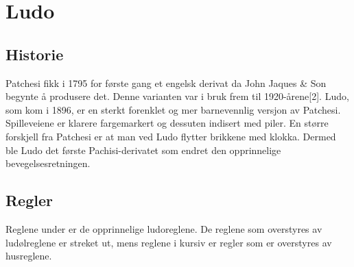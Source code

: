 \documentclass[10pt,a4paper,norsk,openany]{book}
\begin{document}
\mainmatter

\chapter{Ludo}

\section{Historie}

Patchesi fikk i 1795 for første gang et engelsk derivat da John Jaques \& Son
begynte å produsere det. Denne varianten var i bruk frem til 1920-årene[2].
Ludo, som kom i 1896, er en sterkt forenklet og mer barnevennlig versjon av
Patchesi. Spilleveiene er klarere fargemarkert og dessuten indisert med piler.
En større forskjell fra Patchesi er at man ved Ludo flytter brikkene med klokka.
Dermed ble Ludo det første Pachisi-derivatet som endret den opprinnelige
bevegelsesretningen.

\section{Regler} Reglene under er de opprinnelige ludoreglene. De reglene
som overstyres av ludølreglene er streket ut, mens reglene i kursiv er regler
som er overstyres av husreglene.
\end{document}
